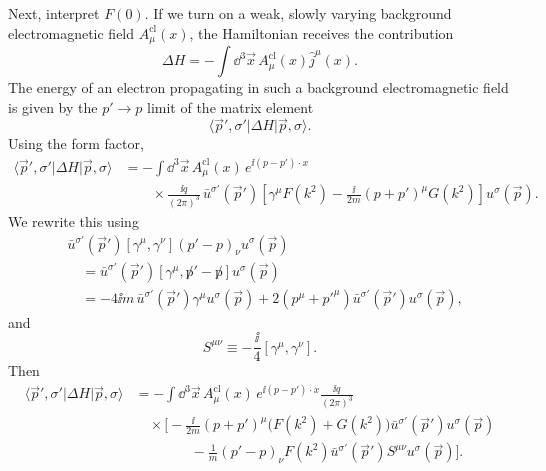 Next, interpret \(F(0)\).  If we turn on a weak, slowly varying background
electromagnetic field \(A_\mu^{\mathrm{cl}}(x)\), the Hamiltonian receives
the contribution
\[
  \Delta H=-\int\dd^3\vec x\,
  A_\mu^{\mathrm{cl}}(x)\widehat j^\mu(x).
\]
The energy of an electron propagating in such a background electromagnetic
field is given by the \(p'\to p\) limit of the matrix element
\[
  \langle \vec p',\sigma'|\Delta H|\vec p,\sigma\rangle .
\]
Using the form factor,
\[
\begin{aligned}
  \langle \vec p',\sigma'|\Delta H|\vec p,\sigma\rangle
  &=
  -\int\dd^3\vec x\,A_\mu^{\mathrm{cl}}(x)\,
  e^{\ii(p-p')\cdot x}
\\
  &\qquad\times
  \frac{\ii q}{(2\pi)^3}\,
  \bar u^{\sigma'}(\vec p')
  \left[
    \gamma^\mu F(k^2)
    -\frac{\ii}{2m}(p+p')^\mu G(k^2)
  \right]
  u^\sigma(\vec p).
\end{aligned}
\]
We rewrite this using
\[
\begin{aligned}
  &\bar u^{\sigma'}(\vec p')
  [\gamma^\mu,\gamma^\nu](p'-p)_\nu
  u^\sigma(\vec p)
\\
  &\quad =
  \bar u^{\sigma'}(\vec p')
  [\gamma^\mu,\not p'-\not p]
  u^\sigma(\vec p)
\\
  &\quad =
  -4\ii m\,
  \bar u^{\sigma'}(\vec p')\gamma^\mu u^\sigma(\vec p)
  +2(p^\mu+p'^\mu)
  \bar u^{\sigma'}(\vec p')u^\sigma(\vec p),
\end{aligned}
\]
and
\[
  S^{\mu\nu}\equiv-\frac{\ii}{4}[\gamma^\mu,\gamma^\nu].
\]
Then
\[
\begin{aligned}
  \langle \vec p',\sigma'|\Delta H|\vec p,\sigma\rangle
  &=
  -\int\dd^3\vec x\,A_\mu^{\mathrm{cl}}(x)\,
  e^{\ii(p-p')\cdot x}
  \frac{\ii q}{(2\pi)^3}
\\
  &\quad\times
  \Biggl[
    -\frac{\ii}{2m}(p+p')^\mu\bigl(F(k^2)+G(k^2)\bigr)
    \bar u^{\sigma'}(\vec p')u^\sigma(\vec p)
\\
  &\qquad\qquad
    -\frac1m(p'-p)_\nu F(k^2)
    \bar u^{\sigma'}(\vec p')S^{\mu\nu}u^\sigma(\vec p)
  \Biggr].
\end{aligned}
\tag{\(\ast\)}
\]

